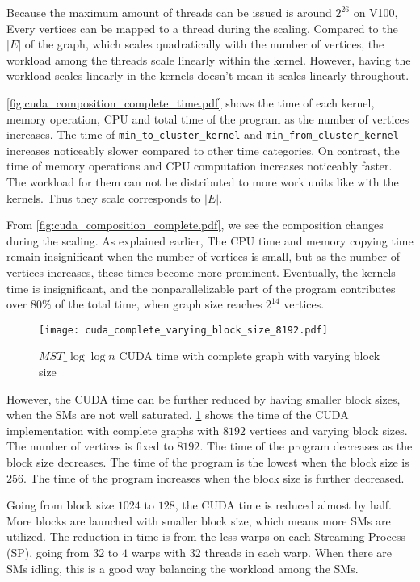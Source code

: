 \documentclass[english, 12pt, a4paper, elec, utf8, a-2b, online]{aaltothesis}
\newcommand{\mstalgo}{$MST\_\log\log{n}$}
\begin{document}
Because the maximum amount of threads can be issued is around $2^{26}$ on V100, Every vertices can be mapped to a thread during the scaling. Compared to the $|E|$ of the graph, which scales quadratically with the number of vertices, the workload among the threads scale linearly within the kernel. However, having the workload scales linearly in the kernels doesn't mean it scales linearly throughout.

\cref{fig:cuda_composition_complete_time.pdf} shows the time of each kernel, memory operation, CPU and total time of the program as the number of vertices increases. The time of \texttt{min\_to\_cluster\_kernel} and \texttt{min\_from\_cluster\_kernel} increases noticeably slower compared to other time categories. On contrast, the time of memory operations and CPU computation increases noticeably faster. The workload for them can not be distributed to more work units like with the kernels. Thus they scale corresponds to $|E|$.

From \cref{fig:cuda_composition_complete.pdf}, we see the composition changes during the scaling. As explained earlier, The CPU time and memory copying time remain insignificant when the number of vertices is small, but as the number of vertices increases, these times become more prominent. Eventually, the kernels time is insignificant, and the nonparallelizable part of the program contributes over $80\%$ of the total time, when graph size reaches $2^{14}$ vertices.


\begin{figure}[h]
	\centering
		\texttt{[image: cuda\_complete\_varying\_block\_size\_8192.pdf]}
	\caption{\mstalgo{} CUDA time with complete graph with varying block size}
	\label{fig:cuda_complete_varying_block_size_8192.pdf}
\end{figure}

However, the CUDA time can be further reduced by having smaller block sizes, when the SMs are not well saturated. \cref{fig:cuda_complete_varying_block_size_8192.pdf} shows the time of the CUDA implementation with complete graphs with $8192$ vertices and varying block sizes. The number of vertices is fixed to $8192$. The time of the program decreases as the block size decreases. The time of the program is the lowest when the block size is $256$. The time of the program increases when the block size is further decreased.

Going from block size $1024$ to $128$, the CUDA time is reduced almost by half. More blocks are launched with smaller block size, which means more SMs are utilized. The reduction in time is from the less warps on each Streaming Process (SP), going from $32$ to $4$ warps with $32$ threads in each warp. When there are SMs idling, this is a good way balancing the workload among the SMs.
\end{document}

